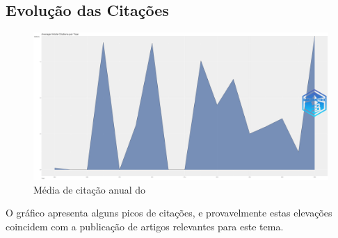 \subsection{Evolução das Citações}

\begin{figure}[ht]
    \centering
    \includegraphics[width=12cm]{experiments/DanielrCardoso/AnaliseBibliometrica/AverageArticleCitationPerYear-2022-02-10.png}
    \caption{Média de citação anual do \dataset\  }
    \label{fig:citDanielrCardoso}
\end{figure}

O gráfico apresenta alguns picos de citações, e provavelmente estas elevações coincidem com a publicação de artigos relevantes para este tema. 

